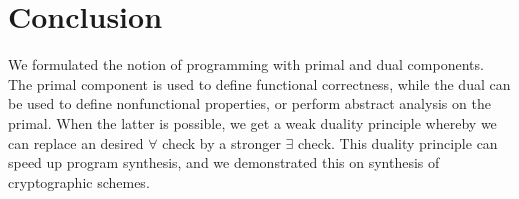 \documentclass[preprint]{sig-alternate-05-2015}
\begin{document}













\section{Conclusion}

We formulated the notion of
programming with primal and dual components.
The primal component is used to define 
functional correctness, while the dual 
can be used to define nonfunctional properties, 
or perform abstract analysis on the primal.
When the latter is possible, we get a weak duality principle
whereby we can replace an desired $\forall$ check
by a stronger $\exists$
check.
%
This duality principle can speed up 
program synthesis, and we demonstrated this on 
synthesis of cryptographic schemes.
\end{document}

